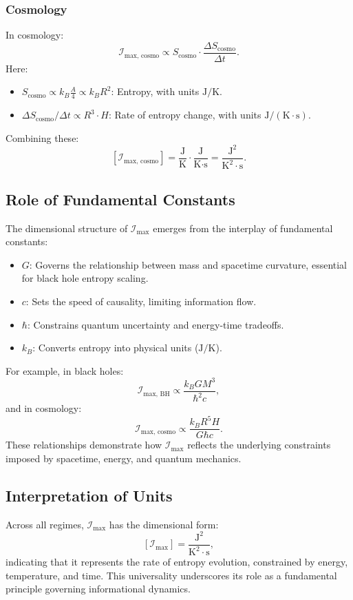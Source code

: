 \documentclass[12pt]{article}
\begin{document}
\subsubsection{Cosmology}
In cosmology:
\[
\mathcal{I}_{\text{max, cosmo}} \propto S_{\text{cosmo}} \cdot \frac{\Delta S_{\text{cosmo}}}{\Delta t}.
\]
Here:
\begin{itemize}
    \item \( S_{\text{cosmo}} \propto k_B \frac{A}{4} \propto k_B R^2 \): Entropy, with units \( \text{J/K} \).
    \item \( \Delta S_{\text{cosmo}} / \Delta t \propto R^3 \cdot H \): Rate of entropy change, with units \( \text{J}/(\text{K} \cdot \text{s}) \).
\end{itemize}
Combining these:
\[
\left[ \mathcal{I}_{\text{max, cosmo}} \right] = \frac{\text{J}}{\text{K}} \cdot \frac{\text{J}}{\text{K} \cdot \text{s}} = \frac{\text{J}^2}{\text{K}^2 \cdot \text{s}}.
\]

\subsection{Role of Fundamental Constants}
The dimensional structure of \( \mathcal{I}_{\text{max}} \) emerges from the interplay of fundamental constants:
\begin{itemize}
    \item \( G \): Governs the relationship between mass and spacetime curvature, essential for black hole entropy scaling.
    \item \( c \): Sets the speed of causality, limiting information flow.
    \item \( \hbar \): Constrains quantum uncertainty and energy-time tradeoffs.
    \item \( k_B \): Converts entropy into physical units (\( \text{J/K} \)).
\end{itemize}

For example, in black holes:
\[
\mathcal{I}_{\text{max, BH}} \propto \frac{k_B G M^3}{\hbar^2 c},
\]
and in cosmology:
\[
\mathcal{I}_{\text{max, cosmo}} \propto \frac{k_B R^5 H}{G \hbar c}.
\]
These relationships demonstrate how \( \mathcal{I}_{\text{max}} \) reflects the underlying constraints imposed by spacetime, energy, and quantum mechanics.

\subsection{Interpretation of Units}
Across all regimes, \( \mathcal{I}_{\text{max}} \) has the dimensional form:
\[
\left[ \mathcal{I}_{\text{max}} \right] = \frac{\text{J}^2}{\text{K}^2 \cdot \text{s}},
\]
indicating that it represents the rate of entropy evolution, constrained by energy, temperature, and time. This universality underscores its role as a fundamental principle governing informational dynamics.
\end{document}
